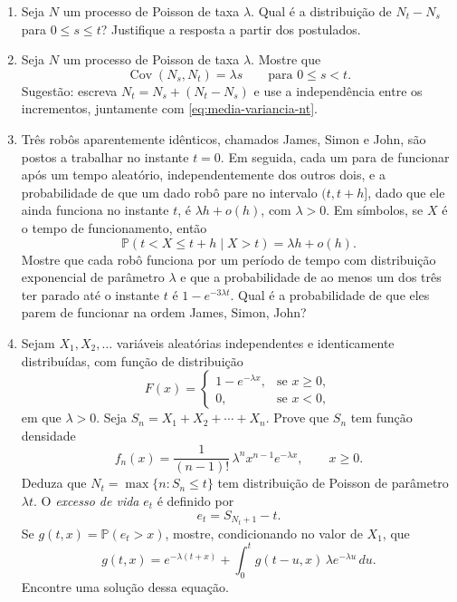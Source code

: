\documentclass[12pt,portuguese]{article}
\theoremstyle{definition}
\theoremstyle{plainexercise}
\theoremstyle{starredexercise}
\theoremstyle{definition}
\begin{document}
\begin{enumerate}[label={\arabic*.}]
\item\label{prob:distribuicao-incremento}
Seja $N$ um processo de Poisson de taxa $\lambda$. Qual é a distribuição de
$N_t-N_s$ para $0\leqslant s\leqslant t$? Justifique a resposta a partir dos
postulados.

\item\label{prob:covariancia-nt}
Seja $N$ um processo de Poisson de taxa $\lambda$. Mostre que
\[
  \operatorname{Cov}(N_s,N_t)=\lambda s
  \qquad\text{para } 0\leqslant s<t.
\]
Sugestão: escreva $N_t=N_s+(N_t-N_s)$ e use a independência entre os
incrementos, juntamente com \eqref{eq:media-variancia-nt}.

\item\label{prob:robos}
Três robôs aparentemente idênticos, chamados James, Simon e John, são postos a
trabalhar no instante $t=0$. Em seguida, cada um para de funcionar após um
tempo aleatório, independentemente dos outros dois, e a probabilidade de que um
dado robô pare no intervalo $(t,t+h]$, dado que ele ainda funciona no instante
$t$, é $\lambda h+o(h)$, com $\lambda>0$. Em símbolos, se $X$ é
o tempo de funcionamento, então
\[
  \mathbb{P}(t<X\leqslant t+h\mid X>t)=\lambda h+o(h).
\]
Mostre que cada robô funciona por um período de tempo com distribuição
exponencial de parâmetro $\lambda$ e que a probabilidade de ao menos um dos
três ter parado até o instante $t$ é $1-e^{-3\lambda t}$. Qual é a
probabilidade de que eles parem de funcionar na ordem James, Simon, John?

\item[\starredproblem]\label{prob:excesso-de-vida}
Sejam $X_1,X_2,\ldots$ variáveis aleatórias independentes e identicamente
distribuídas, com função de distribuição
\[
  F(x)=
  \begin{cases}
    1-e^{-\lambda x}, & \text{se } x\geqslant0,
    \\[0.2cm]
    0, & \text{se } x<0,
  \end{cases}
\]
em que $\lambda>0$. Seja $S_n=X_1+X_2+\cdots+X_n$. Prove que $S_n$ tem função
densidade
\[
  f_n(x)=\frac{1}{(n-1)!}\,\lambda^n x^{n-1}e^{-\lambda x},
  \qquad x\geqslant0.
\]
Deduza que $N_t=\max\{n:S_n\leqslant t\}$ tem distribuição de Poisson de
parâmetro $\lambda t$. O \emph{excesso de vida} $e_t$ é definido por
\[
  e_t=S_{N_t+1}-t.
\]
Se $g(t,x)=\mathbb{P}(e_t>x)$, mostre, condicionando no valor de $X_1$, que
\[
  g(t,x)=e^{-\lambda(t+x)}+\int_0^t g(t-u,x)\,\lambda e^{-\lambda u}\,du.
\]
Encontre uma solução dessa equação.


\end{enumerate}
\end{document}
